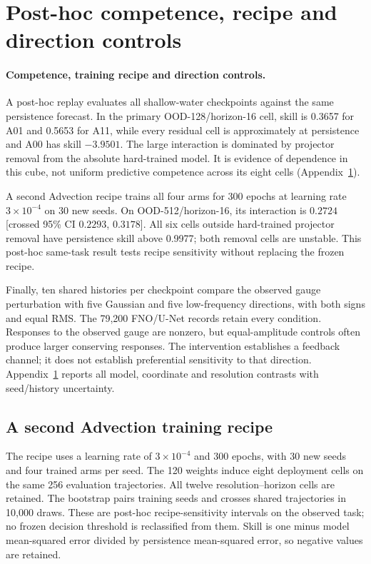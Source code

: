 \documentclass{article}
\begin{document}
\section{Post-hoc competence, recipe and direction controls}
\label{app:revision-expanded}

\paragraph{Competence, training recipe and direction controls.}
A post-hoc replay evaluates all shallow-water checkpoints against the same persistence
forecast. In the primary OOD-128/horizon-16 cell, skill is 0.3657 for A01 and 0.5653
for A11, while every residual cell is approximately at persistence and A00 has skill
$-3.9501$. The large interaction is dominated by projector removal from the absolute
hard-trained model. It is evidence of dependence in this cube, not uniform predictive
competence across its eight cells (Appendix~\ref{app:revision-expanded}).

A second Advection recipe trains all four arms for 300 epochs at learning rate
$3\times10^{-4}$ on 30 new seeds. On OOD-512/horizon-16, its interaction is
$0.2724$ [crossed 95\% CI $0.2293$, $0.3178$]. All six cells outside hard-trained
projector removal have persistence skill above 0.9977; both removal cells are unstable.
This post-hoc same-task result tests recipe sensitivity without replacing the frozen recipe.

Finally, ten shared histories per checkpoint compare the observed gauge perturbation
with five Gaussian and five low-frequency directions, with both signs and equal RMS.
The 79,200 FNO/U-Net records retain every condition. Responses to the observed gauge
are nonzero, but equal-amplitude controls often produce larger conserving responses.
The intervention establishes a feedback channel; it does not establish preferential
sensitivity to that direction. Appendix~\ref{app:revision-expanded} reports all model,
coordinate and resolution contrasts with seed/history uncertainty.



\subsection{A second Advection training recipe}
The recipe uses a learning rate of $3\times10^{-4}$ and 300 epochs, with 30 new seeds
and four trained arms per seed. The 120 weights induce eight deployment cells on the
same 256 evaluation trajectories. All twelve resolution--horizon cells are retained.
The bootstrap pairs training seeds and crosses shared trajectories in 10,000 draws.
These are post-hoc recipe-sensitivity intervals on the observed task; no frozen
decision threshold is reclassified from them. Skill is one minus model mean-squared
error divided by persistence mean-squared error, so negative values are retained.
\end{document}
